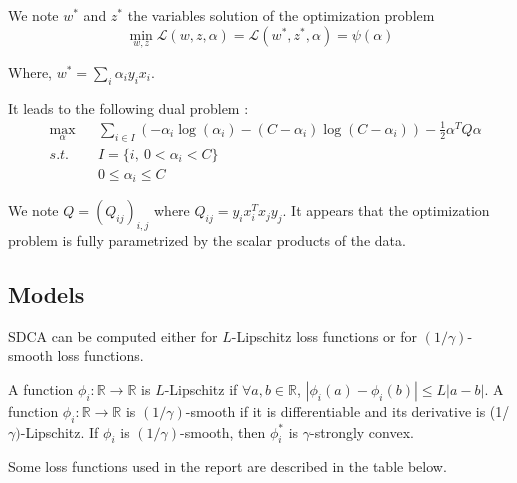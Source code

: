 \documentclass{article}
\newcommand{\abs}[1]{\left|#1\right|}
\begin{document}
We note $w^*$ and $z^*$ the variables solution of the optimization problem
\begin{equation}
	\min_{w, z} \mathcal{L}(w, z, \alpha) = \mathcal{L}(w^*, z^*, \alpha) = \psi(\alpha) 
\end{equation}

Where, $w^* = \sum_i \alpha_i y_i x_i$.

It leads to the following dual problem :
\begin{equation}
	\begin{aligned}
		& \max_{\alpha} & &\sum_{i \in I} (-\alpha_i \log(\alpha_i) - (C-\alpha_i) \log(C - \alpha_i)) - \frac{1}{2} \alpha^TQ\alpha\\
		& s.t.          & &I = \{i,\ 0 < \alpha_i < C \}\\
		&               & &0 \leq \alpha_i \leq C
	\end{aligned}
\end{equation}

We note $Q = (Q_{ij})_{i,j}$ where $Q_{ij} = y_i x_i^T x_j y_j$. It appears that the optimization problem is fully parametrized by the scalar products of the data.

\subsection{Models}

SDCA can be computed either for $L$-Lipschitz loss functions or for $(1/\gamma)$-smooth loss functions.

A function $\phi_i : \mathbb{R} \rightarrow \mathbb{R}$ is $L$-Lipschitz if $\forall a,b \in \mathbb{R}$, $\abs{\phi_i(a)-\phi_i(b)} \leq L \abs{a-b}$.
A function $\phi_i : \mathbb{R} \rightarrow \mathbb{R}$ is $(1/\gamma)$-smooth if it is differentiable and its derivative is (1/$\gamma)$-Lipschitz.
If $\phi_i$ is $(1/\gamma)$-smooth, then $\phi_i^{*}$ is $\gamma$-strongly convex.

Some loss functions used in the report are described in the table below.
\end{document}
